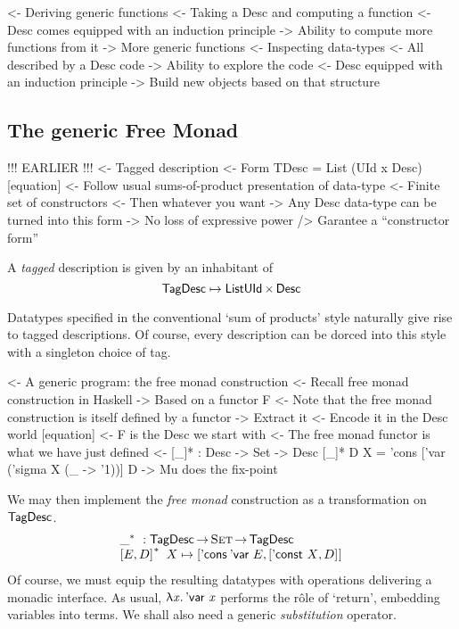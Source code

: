 \begin{structure}
<- Deriving generic functions
    <- Taking a Desc and computing a function
        <- Desc comes equipped with an induction principle
        -> Ability to compute more functions from it
            -> More generic functions
    <- Inspecting data-types
        <- All described by a Desc code
        -> Ability to explore the code
            <- Desc equipped with an induction principle
            -> Build new objects based on that structure
\end{structure}

\subsection{The generic Free Monad}

\begin{structure}
!!! EARLIER !!!
<- Tagged description
    <- Form TDesc = List (UId x Desc) [equation]
    <- Follow usual sums-of-product presentation of data-type
        <- Finite set of constructors
        <- Then whatever you want
    -> Any Desc data-type can be turned into this form
        -> No loss of expressive power
        /> Garantee a ``constructor form''
\end{structure}

A \emph{tagged} description is given by an inhabitant of
\[
 \F{TagDesc} \mapsto \List{\TIMES{\UId}{\Desc}}
\]


Datatypes specified in the conventional `sum of products' style naturally give rise to tagged descriptions. Of course, every description can be dorced into this style with a singleton choice of tag.


\begin{structure}
<- A generic program: the free monad construction
    <- Recall free monad construction in Haskell
        -> Based on a functor F
    <- Note that the free monad construction is itself defined by a functor
        -> Extract it
    <- Encode it in the Desc world [equation]
        <- F is the Desc we start with
        <- The free monad functor is what we have just defined
        <- [\_]* : Desc -> Set -> Desc
           [\_]* D X = 'cons ['var ('sigma X (\_ -> '1))] D
        -> Mu does the fix-point
\end{structure}


We may then implement the \emph{free monad} construction as a
transformation on \(\F{TagDesc}\).
\[\stk{
\FreeMonad{\_} : \F{TagDesc} \To \Set \To \F{TagDesc} \\
\FreeMonad{\pair{E}{D}{}}\:X \mapsto
\pair{\ListCons{\:\DVar{}}{E}}{\pair{\DConst{X}}{D}{}}{}
}\]
Of course, we must equip the resulting datatypes with operations delivering a monadic interface. As usual, \(\LAM{\x}\DVar{\x}\) performs the r\^ole of `return', embedding variables into terms. We shall also need a generic \emph{substitution} operator.


